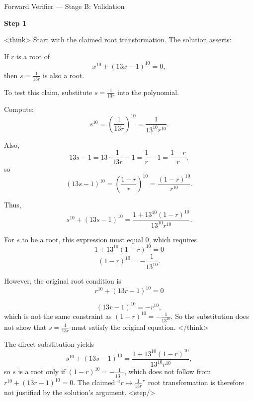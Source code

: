 \documentclass[11pt]{article}
\begin{document}
\begin{exbox}{Forward Verifier — Stage B: Validation}

\textbf{Step 1}

<think>
Start with the claimed root transformation. The solution asserts:

If \(r\) is a root of
\[
x^{10} + (13x - 1)^{10} = 0,
\]
then \(s = \frac{1}{13r}\) is also a root.

To test this claim, substitute \(s = \frac{1}{13r}\) into the polynomial.

Compute:
\[
s^{10} = \left(\frac{1}{13r}\right)^{10} = \frac{1}{13^{10} r^{10}}.
\]

Also,
\[
13s - 1 = 13 \cdot \frac{1}{13r} - 1 = \frac{1}{r} - 1 = \frac{1-r}{r},
\]
so
\[
(13s - 1)^{10} = \left(\frac{1-r}{r}\right)^{10} = \frac{(1-r)^{10}}{r^{10}}.
\]

Thus,
\[
s^{10} + (13s - 1)^{10}
= \frac{1 + 13^{10}(1-r)^{10}}{13^{10} r^{10}}.
\]

For \(s\) to be a root, this expression must equal \(0\), which requires
\[
1 + 13^{10}(1-r)^{10} = 0
\]
\[
(1-r)^{10} = -\frac{1}{13^{10}}.
\]

However, the original root condition is
\[
r^{10} + (13r - 1)^{10} = 0
\]

\[
(13r - 1)^{10} = -r^{10},
\]
which is not the same constraint as \((1-r)^{10} = -\frac{1}{13^{10}}\).
So the substitution does not show that \(s=\frac{1}{13r}\) must satisfy the original equation.
</think>

The direct substitution yields
\[
s^{10} + (13s - 1)^{10} = \frac{1 + 13^{10}(1-r)^{10}}{13^{10} r^{10}},
\]
so \(s\) is a root only if \((1-r)^{10} = -\frac{1}{13^{10}}\), which does not follow from
\(r^{10} + (13r - 1)^{10} = 0\). The claimed “\(r \mapsto \frac{1}{13r}\)” root transformation is therefore not justified by the solution’s argument.
<step/>
\end{exbox}
\end{document}
